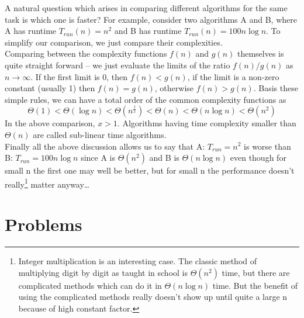 \noindent A natural question which arises in comparing different algorithms for the same task is which one is faster?
For example, consider two algorithms A and B, where A has runtime $T_{run}(n)=n^2$ and B has 
runtime $T_{run}(n)=100n\log n$. To simplify our comparison, we just compare their complexities.\\


\noindent Comparing between the complexity functions $f(n)$ and $g(n)$ themselves is quite straight forward -- 
we just evaluate the limits of the ratio $f(n)/g(n)$ as $n\to\infty$. If the first 
limit is $0$, then $f(n) < g(n)$, if the limit is a non-zero constant (usually 1) then $f(n)=g(n)$, otherwise $f(n)>g(n)$.
Basis these simple rules, we can have a total order of the common complexity functions as 
\[
\Theta(1)<\Theta(\log n)<\Theta(n^\frac{1}{x})<\Theta(n)<\Theta(n\log n)<\Theta(n^2)
\]
In the above comparison, $x > 1$. Algorithms having time complexity smaller than $\Theta(n)$
are called sub-linear time algorithms.\\


\noindent Finally all the above discussion allows us to say that A: $T_{run}=n^2$ is worse than 
B: $T_{run}=100n\log n$ since A is $\Theta(n^2)$ and B is $\Theta(n\log n)$ even 
though for small n the first one may well be better, but for small n the performance doesn't really\footnote{Integer 
multiplication is an interesting case. The classic method of multiplying digit by digit 
as taught in school is $\Theta(n^2)$ time, but there are complicated methods 
which can do it in $\Theta(n\log n)$ time. But the benefit of using the complicated 
methods really doesn't show up until quite a large n because of high constant factor.}
  matter anyway\dots

\clearpage
\section{Problems}

